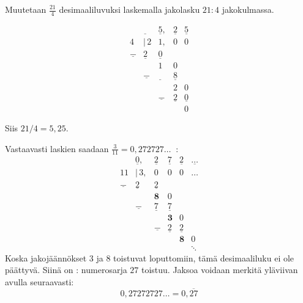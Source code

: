 \begin{esimerkki}
Muutetaan $\frac{21}{4}$ desimaaliluvuksi laskemalla jakolasku $21:4$ jakokulmassa.
%


\[ 
\begin{array}{cccccc}
 & \underline{ \ \ } & \underline{5}, & \underline{2} & \underline{5} \\
 4 & \!\!|\,2 & 1, & 0 & 0 \\
 \underline{-} & \underline{2}& \underline{0} \\
 & & 1 &0 \\
 & \underline{-} &\underline{ \ \ }  & \underline{8} \\
 & & & 2 & 0 \\
 & & \underline{-} & \underline{2} & \underline{0} \\
 & &  & & 0
\end{array}
\]

Siis $21/4=5,25$.



Vastaavasti laskien saadaan $\frac{3}{11}=0,272727\ldots \ $ :
\[ 
\begin{array}{cccccc}
 & \underline{ 0}, & \underline{2} & \underline{7} & \underline{2} & 
 \underline{\ldots} \\
 11 & \!\!|\,3, & 0 & 0 & 0 & \ldots \\
 \underline{-} & \underline{2}& \underline{2} \\
 & & \boldsymbol{8} &0 \\
 & \underline{-} &\underline{ 7 }  & \underline{7} \\
 & & & \boldsymbol{3} & 0 \\
 & & \underline{-} & \underline{2} & \underline{2} \\
 & &  & & \boldsymbol{8} & 0 \\
 & & & & & \ddots
\end{array}
\]
Koska jakojäännökset $3$ ja $8$ toistuvat loputtomiin, tämä desimaaliluku ei ole päättyvä. Siinä on : numerosarja $27$ toistuu. Jaksoa voidaan merkitä yläviivan avulla seuraavasti:
\[0,27272727\ldots = 0,\overline{27}\]
\end{esimerkki}

